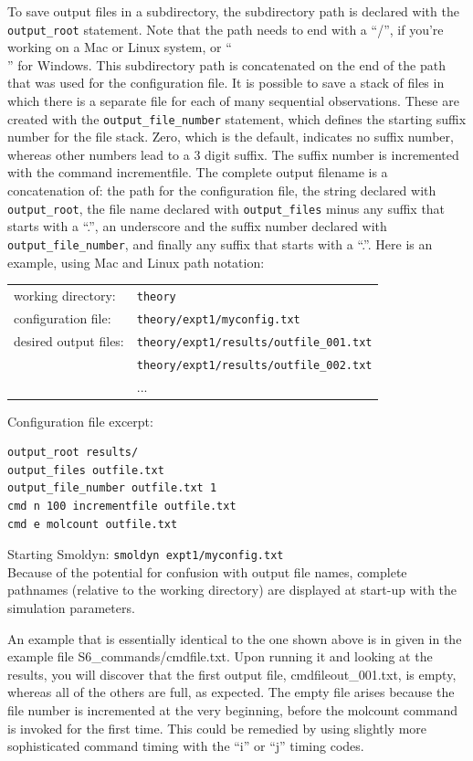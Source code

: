 \documentclass {scrbook}
\newcommand {\ttt} {\texttt}
\begin{document}
To save output files in a subdirectory, the subdirectory path is declared with the \ttt{output\_root} statement. Note that the path needs to end with a ``/'', if you're working on a Mac or Linux system, or ``\\'' for Windows. This subdirectory path is concatenated on the end of the path that was used for the configuration file. It is possible to save a stack of files in which there is a separate file for each of many sequential observations. These are created with the \ttt{output\_file\_number} statement, which defines the starting suffix number for the file stack. Zero, which is the default, indicates no suffix number, whereas other numbers lead to a 3 digit suffix. The suffix number is incremented with the command incrementfile. The complete output filename is a concatenation of: the path for the configuration file, the string declared with \ttt{output\_root}, the file name declared with \ttt{output\_files} minus any suffix that starts with a ``.'', an underscore and the suffix number declared with \ttt{output\_file\_number}, and finally any suffix that starts with a ``.''. Here is an example, using Mac and Linux path notation:

\begin{longtable}[c]{ll}
working directory: & \ttt{theory}\\
configuration file: & \ttt{theory/expt1/myconfig.txt}\\
desired output files: & \ttt{theory/expt1/results/outfile\_001.txt}\\
 & \ttt{theory/expt1/results/outfile\_002.txt}\\
 & ...
\end{longtable}

Configuration file excerpt:
\begin{lstlisting}[style=SSAC]
output_root results/
output_files outfile.txt
output_file_number outfile.txt 1
cmd n 100 incrementfile outfile.txt
cmd e molcount outfile.txt
\end{lstlisting}
Starting Smoldyn: \ttt{smoldyn expt1/myconfig.txt}\\

Because of the potential for confusion with output file names, complete pathnames (relative to the working directory) are displayed at start-up with the simulation parameters.

An example that is essentially identical to the one shown above is in given in the example file S6\_commands/cmdfile.txt. Upon running it and looking at the results, you will discover that the first output file, cmdfileout\_001.txt, is empty, whereas all of the others are full, as expected. The empty file arises because the file number is incremented at the very beginning, before the molcount command is invoked for the first time. This could be remedied by using slightly more sophisticated command timing with the ``i'' or ``j'' timing codes.
\end{document}

